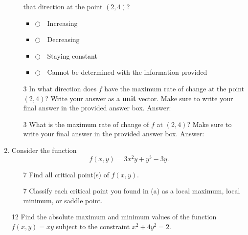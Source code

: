 \documentclass[addpoints,12pt]{exam}
\newcommand{\chooseone}{{\Large$\Circle$\ \ }}
\begin{document}
\begin{enumerate}
\begin{itemize}
that direction at the point $(2,4)$?
\bigskip
\begin{itemize}[label={}]
\item \chooseone Increasing
\item \chooseone Decreasing
\item \chooseone Staying constant
\item \chooseone Cannot be determined with the information provided
\end{itemize}
\bigskip
\item[3] In what direction does $f$ have the maximum rate of change at the point $(2,4)$? Write
your answer as a {\bf unit} vector. Make sure to write your final answer in the provided answer
box.
Answer: \boxed{\Huge\phantom{MMMqqqqqqqqq}}
\bigskip
\vfill
\item[3] What is the maximum rate of change of $f$ at $(2,4)$? Make sure to write your final
answer in the provided answer box.
Answer: \boxed{\Huge\phantom{MMMqqqqqqqqq}}
\vfill
\end{itemize}
\newpage
\item Consider the function
$$f(x,y) = 3x^2y + y^3-3y.$$
%
%
\begin{itemize}
\item[7]
Find all critical point(s) of $f(x,y)$.
\vfill
\item[7]
Classify each critical point you found in (a) as a local maximum, local minimum, or saddle point.
\vfill
\end{itemize}
\newpage
\item[12] Find the absolute maximum and minimum values of the function $f(x,y)= xy$
subject to the constraint $x^2+4y^2=2$.

\end{enumerate}
\end{document}
